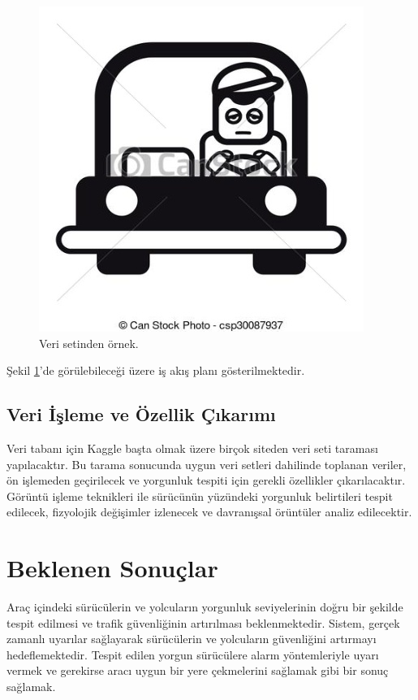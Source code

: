 \documentclass[12pt, a4paper]{report}
\begin{document}
\begin{figure}[!htbp] %
	\centering
	\includegraphics[width=\textwidth]{s1.jpg}
	\caption{Veri setinden örnek.}		   	
	\label{gantt}
\end{figure}
Şekil \ref{gantt}'de görülebileceği üzere
iş akış planı gösterilmektedir.
\maketitle
\subsection{Veri İşleme ve Özellik Çıkarımı}
Veri tabanı için Kaggle başta olmak üzere birçok siteden veri seti taraması yapılacaktır. Bu tarama sonucunda uygun veri setleri dahilinde toplanan veriler, ön işlemeden geçirilecek ve yorgunluk tespiti için gerekli özellikler çıkarılacaktır. Görüntü işleme teknikleri ile sürücünün yüzündeki yorgunluk belirtileri tespit edilecek, fizyolojik değişimler izlenecek ve davranışsal örüntüler analiz edilecektir.
\section{Beklenen Sonuçlar}
Araç içindeki sürücülerin ve yolcuların yorgunluk seviyelerinin doğru bir şekilde tespit edilmesi ve trafik güvenliğinin artırılması beklenmektedir. Sistem, gerçek zamanlı uyarılar sağlayarak sürücülerin ve yolcuların güvenliğini artırmayı hedeflemektedir.
Tespit edilen yorgun sürücülere alarm yöntemleriyle uyarı vermek ve gerekirse aracı uygun bir yere çekmelerini sağlamak gibi bir sonuç sağlamak.



\end{document}
